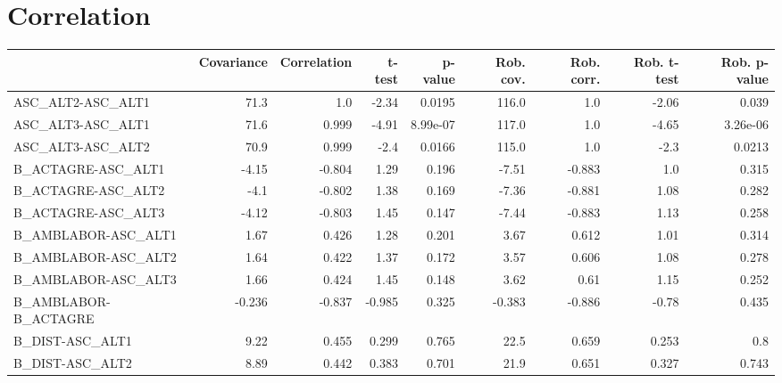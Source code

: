 \section{Correlation}
\begin{tabular}{lrrrrrrrr}
\toprule
{} &  Covariance &  Correlation &  t-test &  p-value &  Rob. cov. &  Rob. corr. &  Rob. t-test &  Rob. p-value \\
\midrule
ASC\_ALT2-ASC\_ALT1             &        71.3 &          1.0 &   -2.34 &   0.0195 &      116.0 &         1.0 &        -2.06 &         0.039 \\
ASC\_ALT3-ASC\_ALT1             &        71.6 &        0.999 &   -4.91 & 8.99e-07 &      117.0 &         1.0 &        -4.65 &      3.26e-06 \\
ASC\_ALT3-ASC\_ALT2             &        70.9 &        0.999 &    -2.4 &   0.0166 &      115.0 &         1.0 &         -2.3 &        0.0213 \\
B\_ACTAGRE-ASC\_ALT1            &       -4.15 &       -0.804 &    1.29 &    0.196 &      -7.51 &      -0.883 &          1.0 &         0.315 \\
B\_ACTAGRE-ASC\_ALT2            &        -4.1 &       -0.802 &    1.38 &    0.169 &      -7.36 &      -0.881 &         1.08 &         0.282 \\
B\_ACTAGRE-ASC\_ALT3            &       -4.12 &       -0.803 &    1.45 &    0.147 &      -7.44 &      -0.883 &         1.13 &         0.258 \\
B\_AMBLABOR-ASC\_ALT1           &        1.67 &        0.426 &    1.28 &    0.201 &       3.67 &       0.612 &         1.01 &         0.314 \\
B\_AMBLABOR-ASC\_ALT2           &        1.64 &        0.422 &    1.37 &    0.172 &       3.57 &       0.606 &         1.08 &         0.278 \\
B\_AMBLABOR-ASC\_ALT3           &        1.66 &        0.424 &    1.45 &    0.148 &       3.62 &        0.61 &         1.15 &         0.252 \\
B\_AMBLABOR-B\_ACTAGRE          &      -0.236 &       -0.837 &  -0.985 &    0.325 &     -0.383 &      -0.886 &        -0.78 &         0.435 \\
B\_DIST-ASC\_ALT1               &        9.22 &        0.455 &   0.299 &    0.765 &       22.5 &       0.659 &        0.253 &           0.8 \\
B\_DIST-ASC\_ALT2               &        8.89 &        0.442 &   0.383 &    0.701 &       21.9 &       0.651 &        0.327 &         0.743 \\

\end{tabular}
